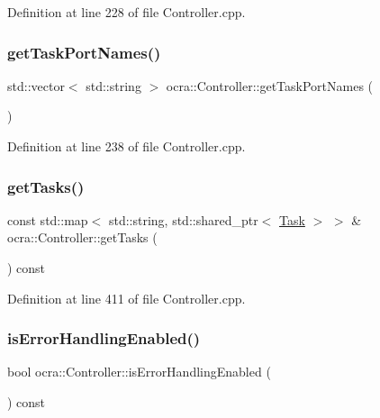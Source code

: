 Definition at line 228 of file Controller.\+cpp.

\hypertarget{classocra_1_1Controller_aa18b2870c3099225050b4e95121cdd3f}{}\label{classocra_1_1Controller_aa18b2870c3099225050b4e95121cdd3f} 
\subsubsection{\texorpdfstring{get\+Task\+Port\+Names()}{getTaskPortNames()}}
{\footnotesize\ttfamily std\+::vector$<$ std\+::string $>$ ocra\+::\+Controller\+::get\+Task\+Port\+Names (\begin{DoxyParamCaption}{ }\end{DoxyParamCaption})}



Definition at line 238 of file Controller.\+cpp.

\hypertarget{classocra_1_1Controller_a3bac43f145c2b75be26565fdcad7811e}{}\label{classocra_1_1Controller_a3bac43f145c2b75be26565fdcad7811e} 
\subsubsection{\texorpdfstring{get\+Tasks()}{getTasks()}}
{\footnotesize\ttfamily const std\+::map$<$ std\+::string, std\+::shared\+\_\+ptr$<$ \hyperlink{classocra_1_1Task}{Task} $>$ $>$ \& ocra\+::\+Controller\+::get\+Tasks (\begin{DoxyParamCaption}{ }\end{DoxyParamCaption}) const}



Definition at line 411 of file Controller.\+cpp.

\hypertarget{classocra_1_1Controller_aa9096ed0ee671ab256085156c1a2c276}{}\label{classocra_1_1Controller_aa9096ed0ee671ab256085156c1a2c276} 
\subsubsection{\texorpdfstring{is\+Error\+Handling\+Enabled()}{isErrorHandlingEnabled()}}
{\footnotesize\ttfamily bool ocra\+::\+Controller\+::is\+Error\+Handling\+Enabled (\begin{DoxyParamCaption}{ }\end{DoxyParamCaption}) const}



